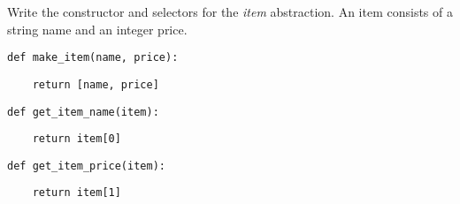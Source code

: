 \question Write the constructor and selectors for the \emph{item} abstraction.
An item consists of a string name and an integer price.

\begin{lstlisting}
def make_item(name, price):
\end{lstlisting}
\begin{solution}[0.5in]
\begin{lstlisting}
    return [name, price]
\end{lstlisting}
\end{solution}

\begin{lstlisting}
def get_item_name(item):
\end{lstlisting}
\begin{solution}[0.5in]
\begin{lstlisting}
    return item[0]
\end{lstlisting}
\end{solution}

\begin{lstlisting}
def get_item_price(item):
\end{lstlisting}
\begin{solution}[0.5in]
\begin{lstlisting}
    return item[1]
\end{lstlisting}
\end{solution}
